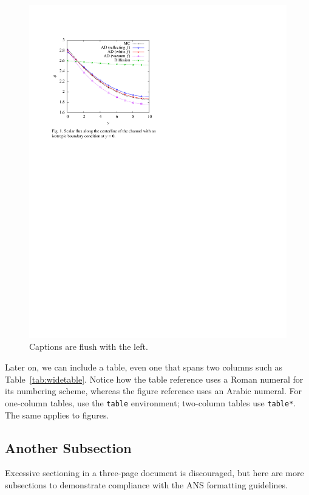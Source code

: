 \documentclass{anstrans}
\begin{document}
\begin{figure}[ht] %
  \centering
  \includegraphics{example_figure}
  \caption{Captions are flush with the left.}
  \label{fig:voltage}
\end{figure}

Later on, we can include a table, even one that spans two columns such as
Table~\ref{tab:widetable}.
Notice how the table reference uses a Roman numeral
for its numbering scheme, whereas the figure reference uses an Arabic numeral.
For one-column tables, use the \verb|table| environment; two-column tables use
\verb|table*|. The same applies to figures.

\subsection{Another Subsection}
Excessive sectioning in a three-page document is discouraged, but here are more
subsections to demonstrate compliance with the ANS formatting guidelines.
\end{document}
